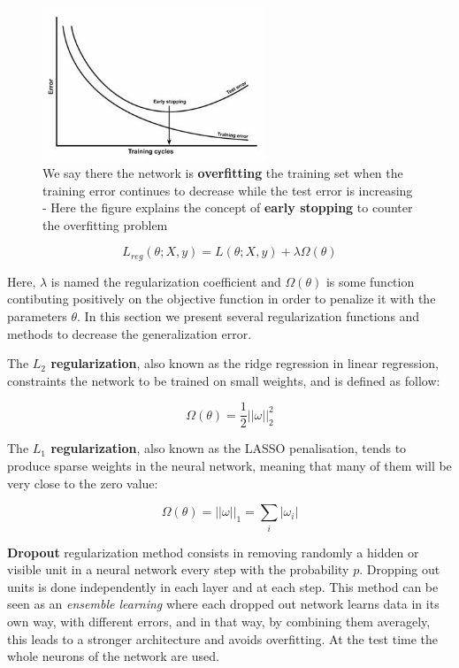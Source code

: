 \documentclass[master, tikz, final,11pt, dvipdfmx]{iscs-thesis}
\begin{document}
\begin{figure}[h]
\centering
\includegraphics[width=0.6\textwidth]{gen}
\caption[Generalization problem explanation]{We say there the network is \textbf{overfitting} the training set when the training error continues to decrease while the test error is increasing - Here the figure explains the concept of \textbf{early stopping} to counter the overfitting problem}
\label{fig:gen} 
\end{figure}



\[
L_{reg}(\theta; X, y) = L(\theta; X, y) + \lambda \Omega(\theta)
\]

Here, $\lambda$ is named the regularization coefficient and $\Omega(\theta)$ is some function contibuting positively on the objective function in order to penalize it with the parameters $\theta$. In this section we present several regularization functions and methods to decrease the generalization error.

The \textbf{$L_2$ regularization}, also known as the ridge regression in linear regression, constraints the network to be trained on small weights, and is defined as follow:

\[
\Omega(\theta)= \frac{1}{2}|| \omega ||^2_2
\]

The \textbf{$L_1$ regularization}, also known as the LASSO penalisation, tends to produce sparse weights in the neural network, meaning that many of them will be very close to the zero value:

\[
\Omega(\theta)= || \omega ||_1=\sum_i|\omega_i|
\]

\textbf{Dropout} \cite{DO} regularization method consists in removing randomly a hidden or visible unit in a neural network every step with the probability $p$. Dropping out units is done independently in each layer and at each step. This method can be seen as an \textit{ensemble learning} where each dropped out network learns data in its own way, with different errors, and in that way, by combining them averagely, this leads to a stronger architecture and avoids overfitting. At the test time the whole neurons of the network are used.
\end{document}
